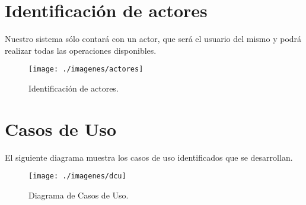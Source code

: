    \section{Identificación de actores}
   Nuestro sistema sólo contará con un actor, que será el usuario del mismo y podrá realizar todas las operaciones disponibles.\\
   \begin{figure} [H] \begin{center}
      \texttt{[image: ./imagenes/actores]}\label{actores}
      \caption{Identificación de actores.}
   \end{center} \end{figure}

   
   \section{Casos de Uso}
   El siguiente diagrama muestra los casos de uso identificados que se desarrollan.\\
   \begin{figure} [H] \begin{center}
      \texttt{[image: ./imagenes/dcu]}\label{dcu}
      \caption{Diagrama de Casos de Uso.}
   \end{center} \end{figure}

